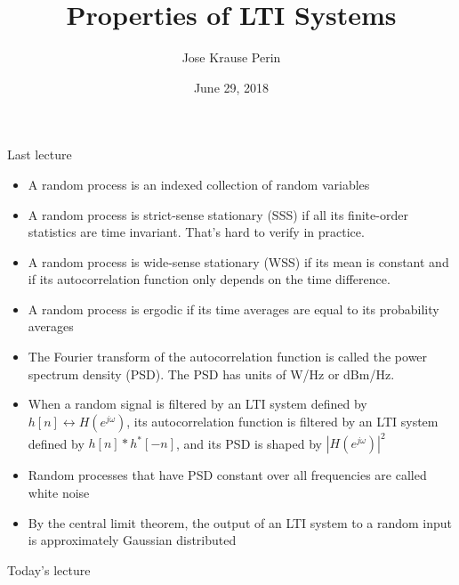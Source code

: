 \documentclass[10pt, aspectratio=169]{beamer}
\title[EE 264]{Properties of LTI Systems}
\author{Jose Krause Perin}
\institute{Stanford University}
\date{June 29, 2018}
\begin{document}
\begin{frame}
  \titlepage
\end{frame}


\begin{frame}{Last lecture}
\begin{itemize}
	\item A random process is an indexed collection of random variables
	\item A random process is strict-sense stationary (SSS) if all its finite-order statistics are time invariant. That's hard to verify in practice.
	\item A random process is wide-sense stationary (WSS) if its mean is constant and if its autocorrelation function only depends on the time difference. 
	\item A random process is ergodic if its time averages are equal to its probability averages
	\item The Fourier transform of the autocorrelation function is called the power spectrum density (PSD). The PSD has units of W/Hz or dBm/Hz.
	\item When a random signal is filtered by an LTI system defined by $h[n]\leftrightarrow H(e^{j\omega})$, its autocorrelation function is filtered by an LTI system defined by $h[n]\ast h^*[-n]$, and its PSD is shaped by $|H(e^{j\omega})|^2$
	\item Random processes that have PSD constant over all frequencies are called white noise
	\item By the central limit theorem, the output of an LTI system to a random input is approximately Gaussian distributed
\end{itemize}
\end{frame}

%
\begin{frame}{Today's lecture}
\tableofcontents
\end{frame}

%
\end{document}
